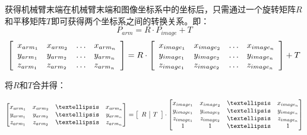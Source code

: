 获得机械臂末端在机械臂末端和图像坐标系中的坐标后，只需通过一个旋转矩阵$R$和平移矩阵$T$即可获得两个坐标系之间的转换关系。即：
$$P _ { a r m } = R \cdot P _ { i m a g e } + T$$
\begin{equation}
    \centering
    \left[ \begin{array} { l l l l } { x _ { a r m _ { 1 } } } & { x _ { a r m _ { 2 } } } & { \dots } & { x _ { a r m _ { n } } } \\ { y _ { a r m _ { 1 } } } & { y _ { a r m _ { 2 } } } & { \dots } & { y _ { a r m _ { n } } } \\ { z _ { a r m _ { 1 } } } & { z _ { a r m _ { 2 } } } & { \dots } & { z _ { a r m _ { n } } } \end{array} \right] = R \cdot \left[ \begin{array} { l l l l } { x _ { i m a g e _ { 1 } } } & { x _ { i m a g e _ { 2 } } } & { \dots } & { x _ { i m a g e _ { n } } } \\ { y _ { i m a g e _ { 1 } } } & { y _ { i m a g e _ { 2 } } } & { \dots } & { y _ { i m a g e _ { n } } } \\ { z _ { i m a g e _ { 1 } } } & { z _ { i m a g e _ { 2 } } } & { \dots } & { z _ { i m a g e _ { n } } } \end{array} \right] + T
    \label{equation:loc_trans}
\end{equation}

将$R$和$T$合并得：

\begin{equation}
    \centering
    \begin{bmatrix}  x_{arm_1} & x_{arm_2} & …& x_{arm_n} \\ 
    y_{arm_1} & y_{arm_2} & …& y_{arm_n} \\  
    z_{arm_1} & z_{arm_2} & …& z_{arm_n} \end{bmatrix} = 
    \left [ \begin{array}{c|c} \begin{matrix} R \end{matrix}& \begin{matrix} T \end{matrix} \end{array} \right ] \cdot 
    \begin{bmatrix}  x_{image_1} & x_{image_2} & …& x_{image_n} \\  y_{image_1} & y_{image_2}  & …  & y_{image_n} \\  z_{image_1} & z_{image_2}  & …  & z_{image_n}  \\ 1&1&…&1 \end{bmatrix}
    \label{equation:loc_trans2}
\end{equation}

